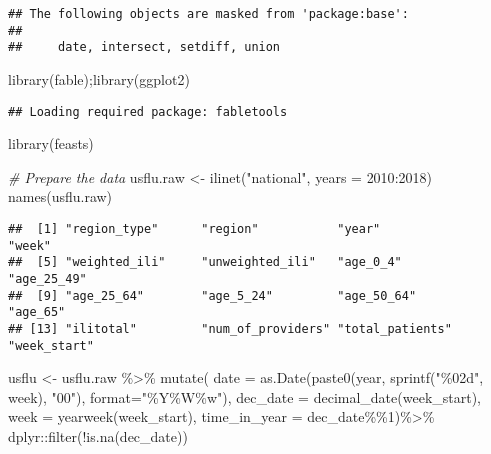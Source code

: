 \documentclass[
]{article}
\newenvironment{Shaded}{\begin{snugshade}}{\end{snugshade}}
\newcommand{\AttributeTok}[1]{\textcolor[rgb]{0.77,0.63,0.00}{#1}}
\newcommand{\CommentTok}[1]{\textcolor[rgb]{0.56,0.35,0.01}{\textit{#1}}}
\newcommand{\DecValTok}[1]{\textcolor[rgb]{0.00,0.00,0.81}{#1}}
\newcommand{\FunctionTok}[1]{\textcolor[rgb]{0.00,0.00,0.00}{#1}}
\newcommand{\NormalTok}[1]{#1}
\newcommand{\OtherTok}[1]{\textcolor[rgb]{0.56,0.35,0.01}{#1}}
\newcommand{\SpecialCharTok}[1]{\textcolor[rgb]{0.00,0.00,0.00}{#1}}
\newcommand{\StringTok}[1]{\textcolor[rgb]{0.31,0.60,0.02}{#1}}
\begin{document}
\begin{verbatim}
## The following objects are masked from 'package:base':
## 
##     date, intersect, setdiff, union
\end{verbatim}

\begin{Shaded}
\begin{Highlighting}[]
\FunctionTok{library}\NormalTok{(fable);}\FunctionTok{library}\NormalTok{(ggplot2)}
\end{Highlighting}
\end{Shaded}

\begin{verbatim}
## Loading required package: fabletools
\end{verbatim}

\begin{Shaded}
\begin{Highlighting}[]
\FunctionTok{library}\NormalTok{(feasts)}
\end{Highlighting}
\end{Shaded}

\begin{Shaded}
\begin{Highlighting}[]
\CommentTok{\# Prepare the data}
\NormalTok{usflu.raw }\OtherTok{\textless{}{-}} \FunctionTok{ilinet}\NormalTok{(}\StringTok{"national"}\NormalTok{, }\AttributeTok{years =} \DecValTok{2010}\SpecialCharTok{:}\DecValTok{2018}\NormalTok{)}
\FunctionTok{names}\NormalTok{(usflu.raw)}
\end{Highlighting}
\end{Shaded}

\begin{verbatim}
##  [1] "region_type"      "region"           "year"             "week"            
##  [5] "weighted_ili"     "unweighted_ili"   "age_0_4"          "age_25_49"       
##  [9] "age_25_64"        "age_5_24"         "age_50_64"        "age_65"          
## [13] "ilitotal"         "num_of_providers" "total_patients"   "week_start"
\end{verbatim}

\begin{Shaded}
\begin{Highlighting}[]
\NormalTok{usflu }\OtherTok{\textless{}{-}}\NormalTok{ usflu.raw }\SpecialCharTok{\%\textgreater{}\%}
  \FunctionTok{mutate}\NormalTok{(}
    \AttributeTok{date =} \FunctionTok{as.Date}\NormalTok{(}\FunctionTok{paste0}\NormalTok{(year, }\FunctionTok{sprintf}\NormalTok{(}\StringTok{"\%02d"}\NormalTok{, week), }\StringTok{"00"}\NormalTok{),}
\AttributeTok{format=}\StringTok{"\%Y\%W\%w"}\NormalTok{),}
\AttributeTok{dec\_date =} \FunctionTok{decimal\_date}\NormalTok{(week\_start),}
\AttributeTok{week =} \FunctionTok{yearweek}\NormalTok{(week\_start),}
\AttributeTok{time\_in\_year =}\NormalTok{ dec\_date}\SpecialCharTok{\%\%}\DecValTok{1}\NormalTok{)}\SpecialCharTok{\%\textgreater{}\%}
\NormalTok{  dplyr}\SpecialCharTok{::}\FunctionTok{filter}\NormalTok{(}\SpecialCharTok{!}\FunctionTok{is.na}\NormalTok{(dec\_date))}
\end{Highlighting}
\end{Shaded}
\end{document}
